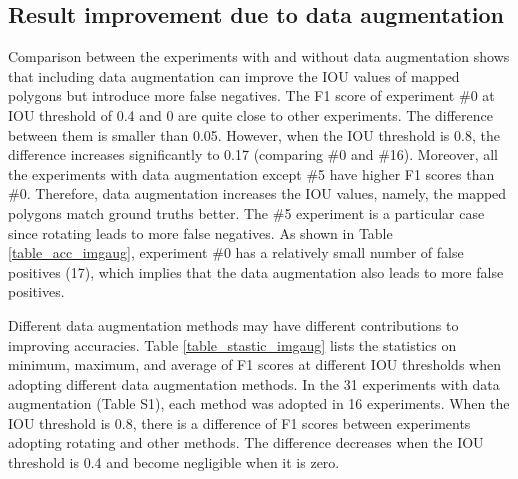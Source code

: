 \documentclass[preprint,12pt,authoryear]{elsarticle}
\begin{document}
\subsection{Result improvement due to data augmentation}
\label{subsec_contrib_dataAug}

Comparison between the experiments with and without data augmentation shows that including data augmentation can improve the IOU values of mapped polygons but introduce more false negatives. The F1 score of experiment \#0 at IOU threshold of 0.4 and 0 are quite close to other experiments. The difference between them is smaller than 0.05. However, when the IOU threshold is 0.8, the difference increases significantly to 0.17 (comparing \#0 and \#16). Moreover, all the experiments with data augmentation except \#5 have higher F1 scores than \#0. Therefore, data augmentation increases the IOU values, namely, the mapped polygons match ground truths better. The \#5 experiment is a particular case since rotating leads to more false negatives. As shown in Table \ref{table_acc_imgaug}, experiment \#0 has a relatively small number of false positives (17), which implies that the data augmentation also leads to more false positives. 

Different data augmentation methods may have different contributions to improving accuracies. Table \ref{table_stastic_imgaug} lists the statistics on minimum, maximum, and average of F1 scores at different IOU thresholds when adopting different data augmentation methods. In the 31 experiments with data augmentation (Table S1), each method was adopted in 16 experiments. When the IOU threshold is 0.8, there is a difference of F1 scores between experiments adopting rotating and other methods. The difference decreases when the IOU threshold is 0.4 and become negligible when it is zero. 
\end{document}

